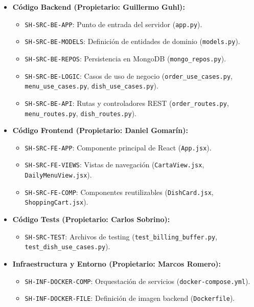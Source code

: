 \documentclass[11pt,a4paper]{article}
\begin{document}
\begin{itemize}
    \item \textbf{Código Backend (Propietario: Guillermo Guhl):}
        \begin{itemize}
            \item \texttt{SH-SRC-BE-APP}: Punto de entrada del servidor (\texttt{app.py}).
            \item \texttt{SH-SRC-BE-MODELS}: Definición de entidades de dominio (\texttt{models.py}).
            \item \texttt{SH-SRC-BE-REPOS}: Persistencia en MongoDB (\texttt{mongo\_repos.py}).
            \item \texttt{SH-SRC-BE-LOGIC}: Casos de uso de negocio (\texttt{order\_use\_cases.py}, \texttt{menu\_use\_cases.py}, \texttt{dish\_use\_cases.py}).
            \item \texttt{SH-SRC-BE-API}: Rutas y controladores REST (\texttt{order\_routes.py}, \texttt{menu\_routes.py}, \texttt{dish\_routes.py}).
        \end{itemize}
        
    \item \textbf{Código Frontend (Propietario: Daniel Gomarín):}
        \begin{itemize}
            \item \texttt{SH-SRC-FE-APP}: Componente principal de React (\texttt{App.jsx}).
            \item \texttt{SH-SRC-FE-VIEWS}: Vistas de navegación (\texttt{CartaView.jsx}, \texttt{DailyMenuView.jsx}).
            \item \texttt{SH-SRC-FE-COMP}: Componentes reutilizables (\texttt{DishCard.jsx}, \texttt{ShoppingCart.jsx}).
        \end{itemize}

    \item \textbf{Código Tests (Propietario: Carlos Sobrino):} 
        \begin{itemize}
            \item \texttt{SH-SRC-TEST}: Archivos de testing (\texttt{test\_billing\_buffer.py}, \texttt{test\_dish\_use\_cases.py}).
        \end{itemize}
    \item \textbf{Infraestructura y Entorno (Propietario: Marcos Romero):} 
        \begin{itemize}
            \item \texttt{SH-INF-DOCKER-COMP}: Orquestación de servicios (\texttt{docker-compose.yml}).
            \item \texttt{SH-INF-DOCKER-FILE}: Definición de imagen backend (\texttt{Dockerfile}).
        \end{itemize}


\end{itemize}
\end{document}
